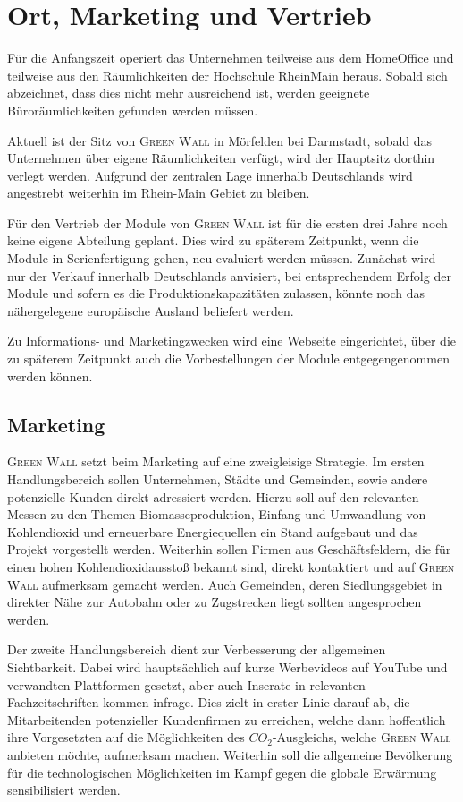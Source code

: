 \chapter{Ort, Marketing und Vertrieb}

Für die Anfangszeit operiert das Unternehmen teilweise aus dem HomeOffice und teilweise aus den Räumlichkeiten der Hochschule RheinMain heraus. 
Sobald sich abzeichnet, dass dies nicht mehr ausreichend ist, werden geeignete Büroräumlichkeiten gefunden werden müssen. 

Aktuell ist der Sitz von \textsc{Green Wall} in Mörfelden bei Darmstadt, sobald das Unternehmen über eigene Räumlichkeiten verfügt, wird der Hauptsitz dorthin verlegt werden. 
Aufgrund der zentralen Lage innerhalb Deutschlands wird angestrebt weiterhin im Rhein-Main Gebiet zu bleiben. 

Für den Vertrieb der Module von \textsc{Green Wall} ist für die ersten drei Jahre noch keine eigene Abteilung geplant. 
Dies wird zu späterem Zeitpunkt, wenn die Module in Serienfertigung gehen, neu evaluiert werden müssen. 
Zunächst wird nur der Verkauf innerhalb Deutschlands anvisiert, bei entsprechendem Erfolg der Module und sofern es die Produktionskapazitäten zulassen, könnte noch das nähergelegene europäische Ausland beliefert werden. 

Zu Informations- und Marketingzwecken wird eine Webseite eingerichtet, über die zu späterem Zeitpunkt auch die Vorbestellungen der Module entgegengenommen werden können. 

    \section{Marketing}

        \textsc{Green Wall} setzt beim Marketing auf eine zweigleisige Strategie.
        Im ersten Handlungsbereich sollen Unternehmen, Städte und Gemeinden, sowie andere potenzielle Kunden direkt adressiert werden.
        Hierzu soll auf den relevanten Messen zu den Themen Biomasseproduktion, Einfang und Umwandlung von Kohlendioxid und erneuerbare Energiequellen ein Stand aufgebaut und das Projekt vorgestellt werden.
        Weiterhin sollen Firmen aus Geschäftsfeldern, die für einen hohen Kohlendioxidausstoß bekannt sind, direkt kontaktiert und auf \textsc{Green Wall} aufmerksam gemacht werden.
        Auch Gemeinden, deren Siedlungsgebiet in direkter Nähe zur Autobahn oder zu Zugstrecken liegt sollten angesprochen werden.

        Der zweite Handlungsbereich dient zur Verbesserung der allgemeinen Sichtbarkeit.
        Dabei wird hauptsächlich auf kurze Werbevideos auf YouTube und verwandten Plattformen gesetzt, aber auch Inserate in relevanten Fachzeitschriften kommen infrage.
        Dies zielt in erster Linie darauf ab, die Mitarbeitenden potenzieller Kundenfirmen zu erreichen, welche dann hoffentlich ihre Vorgesetzten auf die Möglichkeiten des \(CO_2\)-Ausgleichs, welche \textsc{Green Wall} anbieten möchte, aufmerksam machen.
        Weiterhin soll die allgemeine Bevölkerung für die technologischen Möglichkeiten im Kampf gegen die globale Erwärmung sensibilisiert werden.

